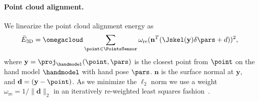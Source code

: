 \paragraph*{Point cloud alignment.} 
%
%
We linearize the point cloud alignment energy as 
%
\begin{equation*}
\bar{E}_{\text{3D}}  = \omegacloud \sum_{\point \in \PointsSensor} \omega_{\text{re}} (\mathbf{n}^T(\Jskel(\mathbf{y}) \delta\pars + d))^2,
\end{equation*}
%
where $\mathbf{y} = \proj_{\handmodel}(\point,\pars)$ is the closest point from $\point$ on the hand model $\handmodel$ with hand pose $\pars$. $\mathbf{n}$ is the surface normal at $\mathbf{y}$, and $\mathbf{d} = (\mathbf{y} - \point)$.
 As we minimize the $\ell_2$ norm we use a weight $\omega_{\text{re}}=1/\|\mathbf{d}\|_2$ in an iteratively re-weighted least squares fashion~\cite{bouaziz_sgp13}.
%
% 
%  
% 
%  
